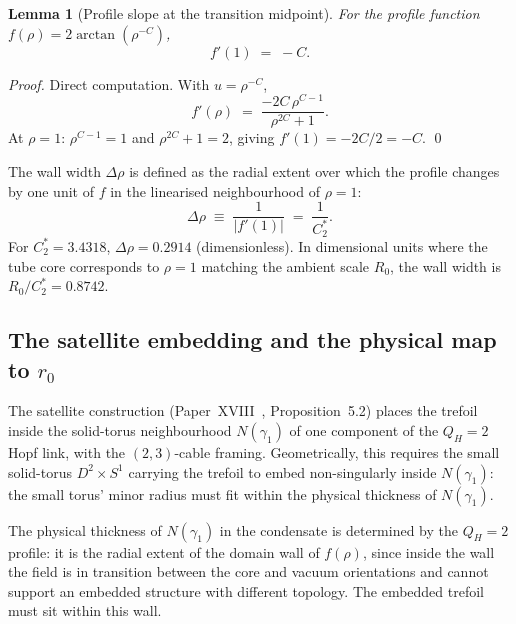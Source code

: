 \documentclass[11pt,a4paper]{article}
\newtheorem{lemma}[theorem]{Lemma}
\theoremstyle{definition}\newtheorem{definition}[theorem]{Definition}
\theoremstyle{remark}
\newcommand{\QH}{Q_H}
\begin{document}
\begin{lemma}[Profile slope at the transition midpoint]
\label{P19:lem:profile_slope}
For the profile function $f(\rho)=2\arctan(\rho^{-C})$,
\begin{equation}
  f'(1) \;=\; -C.
  \label{P19:eq:fprime_at_1}
\end{equation}
\end{lemma}

\begin{proof}
Direct computation.  With $u=\rho^{-C}$,
\begin{equation}
  f'(\rho)
  \;=\; \frac{-2C\,\rho^{C-1}}{\rho^{2C}+1}.
\end{equation}
At $\rho=1$: $\rho^{C-1}=1$ and $\rho^{2C}+1=2$, giving
$f'(1)=-2C/2=-C$.
\qed
\end{proof}

The wall width $\Delta\rho$ is defined as the radial extent over
which the profile changes by one unit of $f$ in the linearised
neighbourhood of $\rho=1$:
\begin{equation}
  \Delta\rho \;\equiv\; \frac{1}{|f'(1)|}
  \;=\; \frac{1}{C_2^*}.
  \label{P19:eq:wall_width}
\end{equation}
For $C_2^*=3.4318$, $\Delta\rho=0.2914$ (dimensionless).  In
dimensional units where the tube core corresponds to $\rho=1$
matching the ambient scale $R_0$, the wall width is
$R_0/C_2^*=0.8742$.

\subsection{The satellite embedding and the physical map to $r_0$}

The satellite construction (Paper~XVIII~\cite{Paper18},
Proposition~5.2) places the trefoil inside the solid-torus %
neighbourhood $N(\gamma_1)$ of one component of the $\QH=2$ Hopf
link, with the $(2,3)$-cable framing.  Geometrically, this
requires the small solid-torus $D^2\times S^1$ carrying the trefoil
to embed non-singularly inside $N(\gamma_1)$: the small torus'
minor radius must fit within the physical thickness of
$N(\gamma_1)$.

The physical thickness of $N(\gamma_1)$ in the condensate is
determined by the $\QH=2$ profile: it is the radial extent of the
domain wall of $f(\rho)$, since inside the wall the field is in
transition between the core and vacuum orientations and cannot
support an embedded structure with different topology.  The
embedded trefoil must sit within this wall.
\end{document}
